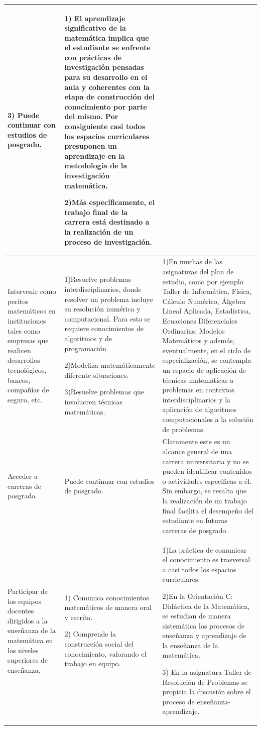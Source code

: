 \documentclass[a4paper, 12pt]{article}
\begin{document}
\begin{center}
\begin{longtable}{|p{}|p{}|p{}|}
  3) Puede continuar con estudios de posgrado.
  &1) El aprendizaje significativo de la matemática implica que el estudiante se enfrente con prácticas de investigación pensadas para su desarrollo en el aula y coherentes con  la etapa de construcción del conocimiento por parte del mismo. Por consiguiente casi todos los espacios curriculares presuponen un aprendizaje en la metodología de la investigación matemática.

  2)Más específicamente, el trabajo final de la carrera está destinado a la realización de un proceso de investigación. \\ \hline

  Intervenir como peritos matemáticos en instituciones tales como empresas que realicen desarrollos tecnológicos, bancos, compañías de seguro, etc.
  &  1)Resuelve problemas interdisciplinarios, donde resolver un problema incluye su resolución numérica y computacional. Para esto se requiere conocimientos de algoritmos y de programación.

  2)Modeliza matemáticamente diferente situaciones.

  3)Resuelve problemas que involucren técnicas matemáticas.
  &1)En muchas de las asignaturas del plan de estudio, como por ejemplo Taller de Informática, Física, Cálculo Numérico, Álgebra Lineal Aplicada, Estadística, Ecuaciones Diferenciales Ordinarias, Modelos Matemáticos y además, eventualmente, en el ciclo de especialización, se contempla un espacio de aplicación de técnicas matemáticas a problemas en contextos interdisciplinarios y la aplicación de algoritmos computacionales a la solución de problemas. \\ \hline

  Acceder a carreras de posgrado.
  & Puede continuar con estudios de posgrado.
  & Claramente este es un  alcance general de una carrera universitaria y no se pueden identificar contenidos o actividades específicas a él. Sin embargo, se resalta que la realización de un trabajo final facilita el desempeño del estudiante en futuras carreras de posgrado.   \\ \hline

  Participar de los equipos docentes dirigidos a la enseñanza de la matemática en los niveles superiores de enseñanza.
  &  1) Comunica conocimientos matemáticos de manera oral y escrita.

  2) Comprende la construcción social del conocimiento, valorando el trabajo en equipo.                  &  1)La práctica de comunicar el conocimiento es trasversal a casi todos los espacios curriculares.

  2)En la Orientación C: Didáctica de la Matemática, se estudian de manera sistemática los procesos de enseñanza y aprendizaje de la enseñanza de la matemática.

  3) En la asignatura Taller de Resolución de Problemas se propicia la discusión sobre el proceso de enseñanza-aprendizaje.\\ \hline
\end{longtable}
\end{center}
\end{document}
